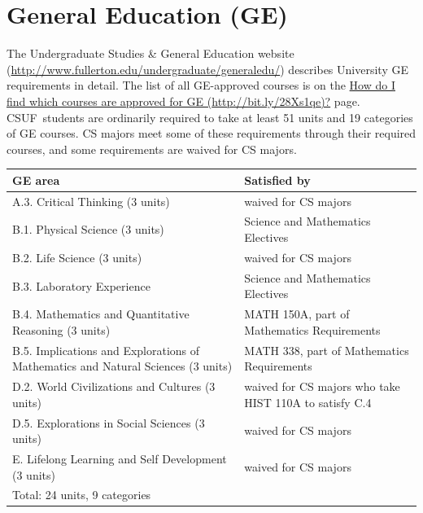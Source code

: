 \documentclass{book}
\newcommand{\CampusName}{CSUF}
\begin{document}
\section{General Education (GE)}

\newcommand{\gecourselist}{ \href{http://www.fullerton.edu/undergraduate/generaledu/ge_approvedcourses.asp}{How do I find which courses are approved for GE (\url{http://bit.ly/28Xs1qe})?} }

The Undergraduate Studies \& General Education website (\url{http://www.fullerton.edu/undergraduate/generaledu/}) describes University GE requirements in detail. The list of all GE-approved courses is on the \gecourselist page. \CampusName~students are ordinarily required to take at least 51 units and 19 categories of GE courses. CS majors meet some of these requirements through their required courses, and some requirements are waived for CS majors.

\begin{center}
\begin{tabular}{| p{3in} | p{3in} |} \hline
  \textbf{GE area} & \textbf{Satisfied by} \\ \hline
  A.3. Critical Thinking (3 units) & waived for CS majors \\ \hline
  B.1. Physical Science (3 units) & Science and Mathematics Electives \\ \hline
  B.2. Life Science (3 units) & waived for CS majors \\ \hline
  B.3. Laboratory Experience & Science and Mathematics Electives \\ \hline
  B.4. Mathematics and Quantitative Reasoning (3 units) & MATH 150A, part of Mathematics Requirements \\ \hline
  B.5. Implications and Explorations of Mathematics and Natural Sciences (3 units) & MATH 338, part of Mathematics Requirements \\ \hline
  D.2. World Civilizations and Cultures (3 units) & waived for CS majors who take HIST 110A to satisfy C.4 \\ \hline
  D.5. Explorations in Social Sciences (3 units) & waived for CS majors \\ \hline
  E. Lifelong Learning and Self Development (3 units) & waived for CS majors \\ \hline
  \multicolumn{2}{|l|}{Total: 24 units, 9 categories} \\ \hline
\end{tabular}
\end{center}
\end{document}
